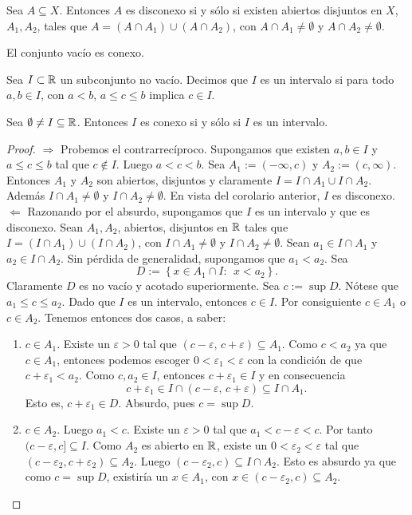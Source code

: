 \begin{corolario}
Sea $A\subseteq X$. Entonces $A$ es disconexo si y sólo si existen abiertos disjuntos en $X$, $A_1, A_2$, tales que $A=(A\cap A_1)\cup (A\cap A_2)$, con $A\cap A_1\neq \emptyset$ y $A\cap A_2\neq \emptyset$.
\end{corolario}

\begin{remark}
El conjunto vacío es conexo.
\end{remark}

\begin{definicion}
Sea $I\subset \mathbb{R}$ un subconjunto no vacío. Decimos que $I$ es un intervalo si para todo $a,b\in I$, con $a<b$, $a\leq c\leq b$ implica $c\in I$.
\end{definicion}

\begin{teorema}\label{conx-int-R}
Sea $\emptyset \neq I\subseteq \mathbb{R}$. Entonces $I$ es conexo si y sólo si $I$ es un intervalo.
\end{teorema}
\begin{proof}
$\Rightarrow$  Probemos el contrarrecíproco. Supongamos que existen $a,b \in I$ y $a\leq c\leq b$ tal que $c\notin I$. Luego $a<c<b$. Sea $A_1:=(-\infty, c) $ y $A_2:=( c, \infty) $. Entonces $A_1$ y $A_2$ son abiertos, disjuntos y claramente $I=I\cap A_1 \cup I\cap A_2$. Además $I\cap A_1\neq \emptyset$ y $I\cap A_2\neq \emptyset$. En vista del corolario anterior, $I$ es disconexo.\\
$\Leftarrow$ Razonando por el absurdo, supongamos que $I$ es un intervalo y que es disconexo. Sean $A_1, A_2$, abiertos, disjuntos en $\mathbb{R}$ tales que $I=(I\cap A_1 )\cup  (I \cap A_2)$, con $ I\cap A_1 \neq \emptyset$ y $ I\cap A_2 \neq \emptyset$. Sean $a_1 \in I\cap A_1$ y $a_2 \in I\cap A_2$. Sin pérdida de generalidad, supongamos que $a_1 <a_2$. Sea \[D:=\left\{ x\in A_1 \cap I : \ \ x<a_2\right\}.\]
Claramente $D$ es no vacío y acotado superiormente. Sea $c:=\sup D$. Nótese que $a_1 \leq c\leq a_2 .$ Dado que $I$ es un intervalo, entonces $c\in I.$ Por consiguiente $c\in A_1$ o $c\in A_2$. Tenemos entonces dos casos, a saber:
\begin{enumerate}
    \item $c\in A_1$. Existe un $\varepsilon >0$ tal que $(c-\varepsilon, \, c+\varepsilon) \subseteq A_1$. Como $c<a_2$ ya que  $c\in A_1$, entonces podemos escoger $0<\varepsilon_1 <\varepsilon$ con la condición de que $c+\varepsilon_1 <a_2$. Como $c,a_2\in I$, entonces $c+\varepsilon_1 \in I$ y en consecuencia
    \[ c+\varepsilon_1 \in I \cap  (c-\varepsilon, \, c+\varepsilon) \subseteq I\cap A_1.\]
    Esto es, $c+\varepsilon_1 \in D$. Absurdo, pues $c=\sup D$.
    \item $c\in A_2$. Luego $a_1 <c.$ Existe un $\varepsilon >0 $ tal que $a_1 <c-\varepsilon <c$. Por tanto $(c-\varepsilon , c]\subseteq I$. Como $A_2$ es abierto en $\mathbb{R}$, existe un $0<\varepsilon_2 <\varepsilon$ tal que $(c-\varepsilon_2, c+\varepsilon_2)\subseteq A_2$. Luego $(c-\varepsilon_2, c) \subseteq I\cap A_2$. Esto es absurdo ya que como $c=\sup D$, existiría un $x\in A_1$, con $x\in (c-\varepsilon_2, c) \subseteq A_2.$
\end{enumerate}
\end{proof}


